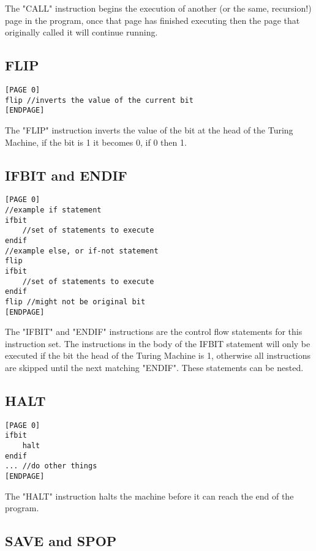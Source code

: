 \documentclass[11pt]{article}
\begin{document}
The "CALL" instruction begins the execution of another (or the same, recursion!) page in the program, once that page has finished executing then the page that originally called it will continue running.\linebreak

\subsection{FLIP}

\begin{lstlisting}
[PAGE 0]
flip //inverts the value of the current bit
[ENDPAGE]
\end{lstlisting}

The "FLIP" instruction inverts the value of the bit at the head of the Turing Machine, if the bit is 1 it becomes 0, if 0 then 1.\linebreak

\subsection{IFBIT and ENDIF}
\begin{lstlisting}
[PAGE 0]
//example if statement
ifbit
	//set of statements to execute
endif
//example else, or if-not statement
flip
ifbit
	//set of statements to execute
endif
flip //might not be original bit
[ENDPAGE]
\end{lstlisting}

The "IFBIT" and "ENDIF" instructions are the control flow statements for this instruction set. The instructions in the body of the IFBIT statement will only be executed if the bit the head of the Turing Machine is 1, otherwise all instructions are skipped until the next matching "ENDIF". These statements can be nested.

\subsection{HALT}

\begin{lstlisting}
[PAGE 0]
ifbit
	halt
endif
... //do other things
[ENDPAGE]
\end{lstlisting}

The "HALT" instruction halts the machine before it can reach the end of the program.

\subsection{SAVE and SPOP}
\end{document}

